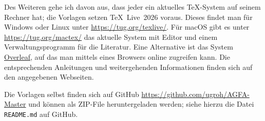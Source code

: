 Des Weiteren gehe ich davon aus, dass jeder ein aktuelles \TeX{}-System auf seinem Rechner hat; die Vorlagen setzen \TeX~Live~2026 voraus. 
Dieses findet man für Windows oder Linux unter \href{https://tug.org/texlive/}{https://tug.org/texlive/}.
Für macOS gibt es unter \href{https://tug.org/mactex/}{https://tug.org/mactex/} das aktuelle System mit Editor und einem Verwaltungsprogramm für die Literatur.
Eine Alternative ist das System \href{https://www.overleaf.com}{Overleaf}, auf das man mittels eines Browsers online zugreifen kann.
Die entsprechenden Anleitungen und weitergehenden Informationen finden sich auf den angegebenen Webseiten.

Die Vorlagen selbst finden sich auf GitHub 
\href{https://github.com/ugroh/AGFA-Master}{https://github.com/ugroh/AGFA-Master} und können als ZIP-File heruntergeladen werden; siehe hierzu die Datei \texttt{README.md} auf GitHub. 







